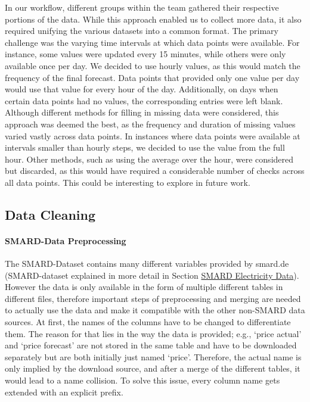 \documentclass[a4paper]{article}
\begin{document}
In our workflow, different groups within the team gathered their
respective portions of the data. While this approach enabled us to
collect more data, it also required unifying the various datasets into a
common format. The primary challenge was the varying time intervals at
which data points were available. For instance, some values were updated
every 15 minutes, while others were only available once per day. We
decided to use hourly values, as this would match the frequency of the
final forecast. Data points that provided only one value per day would
use that value for every hour of the day. Additionally, on days when
certain data points had no values, the corresponding entries were left
blank. Although different methods for filling in missing data were
considered, this approach was deemed the best, as the frequency and
duration of missing values varied vastly across data points. In
instances where data points were available at intervals smaller than
hourly steps, we decided to use the value from the full hour. Other
methods, such as using the average over the hour, were considered but
discarded, as this would have required a considerable number of checks
across all data points. This could be interesting to explore in future
work.

    \subsection{Data Cleaning}\label{data-cleaning}

    \paragraph{SMARD-Data Preprocessing}\label{smard-data-preprocessing}

The SMARD-Dataset contains many different variables provided by smard.de
(SMARD-dataset explained in more detail in Section
\hyperref[smard-electricity-market-data]{SMARD Electricity Data}).
However the data is only available in the form of multiple different
tables in different files, therefore important steps of preprocessing
and merging are needed to actually use the data and make it compatible
with the other non-SMARD data sources. At first, the names of the
columns have to be changed to differentiate them. The reason for that
lies in the way the data is provided; e.g., `price actual' and `price
forecast' are not stored in the same table and have to be downloaded
separately but are both initially just named `price'. Therefore, the
actual name is only implied by the download source, and after a merge of
the different tables, it would lead to a name collision. To solve this
issue, every column name gets extended with an explicit prefix.
\end{document}
